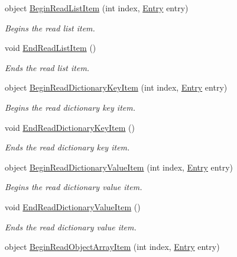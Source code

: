 \begin{DoxyCompactItemize}
object \hyperlink{class_serialization_1_1_binary_serializer_a8d689325716bdb8c393e16414fefd59f}{Begin\+Read\+List\+Item} (int index, \hyperlink{class_serialization_1_1_entry}{Entry} entry)
\begin{DoxyCompactList}\small\item\em Begins the read list item. \end{DoxyCompactList}\item 
void \hyperlink{class_serialization_1_1_binary_serializer_af0b58fefbd4bea88a09cffc7bdcef862}{End\+Read\+List\+Item} ()
\begin{DoxyCompactList}\small\item\em Ends the read list item. \end{DoxyCompactList}\item 
object \hyperlink{class_serialization_1_1_binary_serializer_ae4b30ced98b913465edd4dafb21da8c4}{Begin\+Read\+Dictionary\+Key\+Item} (int index, \hyperlink{class_serialization_1_1_entry}{Entry} entry)
\begin{DoxyCompactList}\small\item\em Begins the read dictionary key item. \end{DoxyCompactList}\item 
void \hyperlink{class_serialization_1_1_binary_serializer_a40a35f67bceb9c7c1cac774afe4b5fd0}{End\+Read\+Dictionary\+Key\+Item} ()
\begin{DoxyCompactList}\small\item\em Ends the read dictionary key item. \end{DoxyCompactList}\item 
object \hyperlink{class_serialization_1_1_binary_serializer_afd286629a7b6d4be74e344f7b692ce4d}{Begin\+Read\+Dictionary\+Value\+Item} (int index, \hyperlink{class_serialization_1_1_entry}{Entry} entry)
\begin{DoxyCompactList}\small\item\em Begins the read dictionary value item. \end{DoxyCompactList}\item 
void \hyperlink{class_serialization_1_1_binary_serializer_aa8214913ce84b050614e38c5aadc0b71}{End\+Read\+Dictionary\+Value\+Item} ()
\begin{DoxyCompactList}\small\item\em Ends the read dictionary value item. \end{DoxyCompactList}\item 
object \hyperlink{class_serialization_1_1_binary_serializer_ac4a4d8051a5c10d82e23fd004ad344fb}{Begin\+Read\+Object\+Array\+Item} (int index, \hyperlink{class_serialization_1_1_entry}{Entry} entry)

\end{DoxyCompactItemize}
